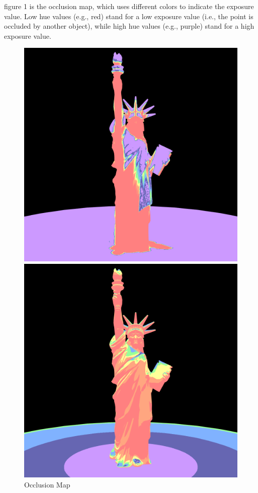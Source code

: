 \documentclass{article}
\begin{document}
figure 1 is the occlusion map, which uses different colors to indicate the exposure value. Low hue 
values (e.g., red) stand for a low exposure value (i.e., the point is occluded by another object), while high hue 
values (e.g., purple) stand for a high exposure value.

\begin{figure}[h]
  \centering
  \begin{minipage}{0.4\textwidth}
      \centering
      \includegraphics[width=\textwidth]{images/OcclusionMap.png}
      \caption{Occlusion Map}
      \label{fig:OcclusionMap}
  \end{minipage}\hfill
  \begin{minipage}{0.4\textwidth}
      \centering
      \includegraphics[width=\textwidth]{images/InclinationMap.png}

\end{minipage}
\end{figure}
\end{document}
